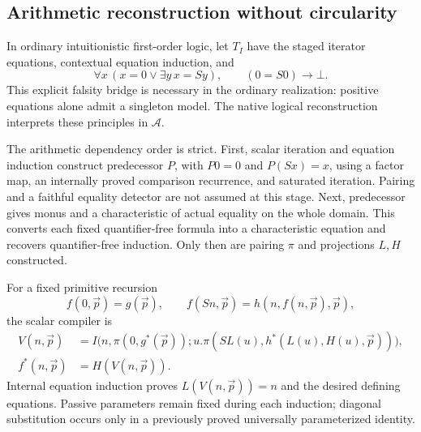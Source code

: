 \documentclass[11pt,letterpaper]{article}
\theoremstyle{definition}\newtheorem{definition}[theorem]{Definition}
\theoremstyle{remark}\newtheorem{remark}[theorem]{Remark}
\begin{document}
\subsection{Arithmetic reconstruction without circularity}

In ordinary intuitionistic first-order logic, let \(T_I\) have the
staged iterator equations, contextual equation induction, and
\[
 \forall x\,(x=0\vee\exists y\,x=Sy),\qquad
 (0=S0)\to\bot.
\]
This explicit falsity bridge is necessary in the ordinary realization:
positive equations alone admit a singleton model. The native logical
reconstruction interprets these principles in \(\mathcal A\).

The arithmetic dependency order is strict. First, scalar iteration and
equation induction construct predecessor \(P\), with
\(P0=0\) and \(P(Sx)=x\), using a factor map, an internally proved
comparison recurrence, and saturated iteration. Pairing and a faithful
equality detector are not assumed at this stage. Next, predecessor
gives monus and a characteristic of actual equality on the whole domain.
This converts each fixed quantifier-free formula into a characteristic
equation and recovers quantifier-free induction. Only then are pairing
\(\pi\) and projections \(L,H\) constructed.

For a fixed primitive recursion
\[
 f(0,\vec p)=g(\vec p),\qquad
 f(Sn,\vec p)=h(n,f(n,\vec p),\vec p),
\]
the scalar compiler is
\begin{align*}
 V(n,\vec p)&=I\bigl(n,\pi(0,g^*(\vec p));
 u.\pi(SL(u),h^*(L(u),H(u),\vec p))\bigr),\\
 f^*(n,\vec p)&=H(V(n,\vec p)).
\end{align*}
Internal equation induction proves \(L(V(n,\vec p))=n\) and the
desired defining equations. Passive parameters remain fixed during
each induction; diagonal substitution occurs only in a previously
proved universally parameterized identity.
\end{document}
